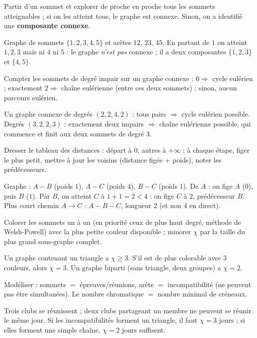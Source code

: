 Partir d'un sommet et explorer de proche en proche tous les sommets atteignables ; si on
les atteint tous, le graphe est connexe. Sinon, on a identifié une \textbf{composante
connexe}.
\begin{exemple}
Graphe de sommets $\{1,2,3,4,5\}$ et arêtes $12,\,23,\,45$. En partant de $1$ on atteint
$1,2,3$ mais ni $4$ ni $5$ : le graphe \emph{n'est pas} connexe ; il a deux composantes
$\{1,2,3\}$ et $\{4,5\}$.
\end{exemple}

Compter les sommets de degré impair sur un graphe connexe : $0\Rightarrow$ cycle eulérien ;
exactement $2\Rightarrow$ chaîne eulérienne (entre ces deux sommets) ; sinon, aucun parcours
eulérien.
\begin{exemple}
Un graphe connexe de degrés $(2,2,4,2)$ : tous pairs $\Rightarrow$ cycle eulérien possible.
Degrés $(3,2,2,3)$ : exactement deux impairs $\Rightarrow$ chaîne eulérienne possible, qui
commence et finit aux deux sommets de degré $3$.
\end{exemple}

Dresser le tableau des distances : départ à $0$, autres à $+\infty$ ; à chaque étape, figer
le plus petit, mettre à jour les voisins (distance figée $+$ poids), noter les prédécesseurs.
\begin{exemple}
Graphe : $A\!-\!B$ (poids $1$), $A\!-\!C$ (poids $4$), $B\!-\!C$ (poids $1$). De $A$ :
on fige $A$ ($0$), puis $B$ ($1$). Par $B$, on atteint $C$ à $1+1=2<4$ : on fige $C$ à $2$,
prédécesseur $B$. Plus court chemin $A\to C$ : $A-B-C$, longueur $2$ (et non $4$ en direct).
\end{exemple}

Colorer les sommets un à un (en priorité ceux de plus haut degré, méthode de Welsh-Powell)
avec la plus petite couleur disponible ; minorer $\chi$ par la taille du plus grand
sous-graphe complet.
\begin{exemple}
Un graphe contenant un triangle a $\chi\ge 3$. S'il est de plus colorable avec $3$ couleurs,
alors $\chi=3$. Un graphe biparti (sans triangle, deux groupes) a $\chi=2$.
\end{exemple}

Modéliser : sommets $=$ épreuves/réunions, arête $=$ incompatibilité (ne peuvent pas être
simultanées). Le nombre chromatique $=$ nombre minimal de créneaux.
\begin{exemple}
Trois clubs se réunissent ; deux clubs partageant un membre ne peuvent se réunir le même
jour. Si les incompatibilités forment un triangle, il faut $\chi=3$ jours ; si elles forment
une simple chaîne, $\chi=2$ jours suffisent.
\end{exemple}

